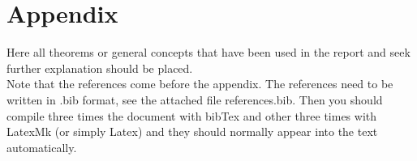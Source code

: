 \section{Appendix}

Here all theorems or general concepts that have been used in the report and seek further explanation should be placed.\\[3pt]
Note that the references come before the appendix. The references need to be written in .bib format, see the attached file references.bib. Then you should compile three times the document with bibTex and other three times with LatexMk (or simply Latex) and they should normally appear into the text automatically.